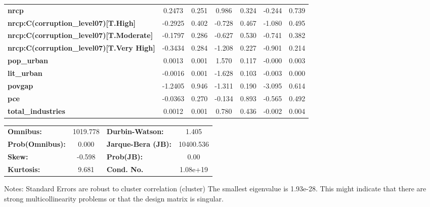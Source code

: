\begin{center}
\begin{tabular}{lcccccc}
\textbf{nrcp}                                                                                       &       0.2473  &        0.251     &     0.986  &         0.324        &       -0.244    &        0.739     \\
\textbf{nrcp:C(corruption\_level07)[T.High]}                                                        &      -0.2925  &        0.402     &    -0.728  &         0.467        &       -1.080    &        0.495     \\
\textbf{nrcp:C(corruption\_level07)[T.Moderate]}                                                    &      -0.1797  &        0.286     &    -0.627  &         0.530        &       -0.741    &        0.382     \\
\textbf{nrcp:C(corruption\_level07)[T.Very High]}                                                   &      -0.3434  &        0.284     &    -1.208  &         0.227        &       -0.901    &        0.214     \\
\textbf{pop\_urban}                                                                                 &       0.0013  &        0.001     &     1.570  &         0.117        &       -0.000    &        0.003     \\
\textbf{lit\_urban}                                                                                 &      -0.0016  &        0.001     &    -1.628  &         0.103        &       -0.003    &        0.000     \\
\textbf{povgap}                                                                                     &      -1.2405  &        0.946     &    -1.311  &         0.190        &       -3.095    &        0.614     \\
\textbf{pce}                                                                                        &      -0.0363  &        0.270     &    -0.134  &         0.893        &       -0.565    &        0.492     \\
\textbf{total\_industries}                                                                          &       0.0012  &        0.001     &     0.780  &         0.436        &       -0.002    &        0.004     \\
\bottomrule
\end{tabular}
\begin{tabular}{lclc}
\textbf{Omnibus:}       & 1019.778 & \textbf{  Durbin-Watson:     } &     1.405  \\
\textbf{Prob(Omnibus):} &   0.000  & \textbf{  Jarque-Bera (JB):  } & 10400.536  \\
\textbf{Skew:}          &  -0.598  & \textbf{  Prob(JB):          } &      0.00  \\
\textbf{Kurtosis:}      &   9.681  & \textbf{  Cond. No.          } &  1.08e+19  \\
\bottomrule
\end{tabular}
\end{center}

Notes: \newline
 [1] Standard Errors are robust to cluster correlation (cluster) \newline
 [2] The smallest eigenvalue is 1.93e-28. This might indicate that there are \newline
 strong multicollinearity problems or that the design matrix is singular.